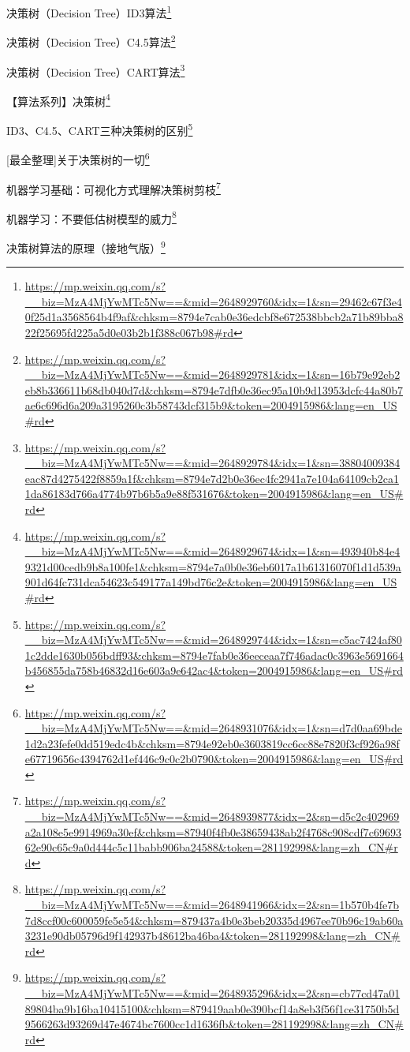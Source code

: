 \documentclass[]{ctexbook}
\renewcommand{\href}[2]{#2\footnote{\url{#1}}}
\begin{document}
\href{https://mp.weixin.qq.com/s?__biz=MzA4MjYwMTc5Nw==\&mid=2648929760\&idx=1\&sn=29462c67f3e40f25d1a3568564b4f9af\&chksm=8794e7cab0e36edcbf8e672538bbcb2a71b89bba822f25695fd225a5d0e03b2b1f388c067b98\#rd}{决策树（Decision Tree）ID3算法}

\href{https://mp.weixin.qq.com/s?__biz=MzA4MjYwMTc5Nw==\&mid=2648929781\&idx=1\&sn=16b79e92eb2eb8b336611b68db040d7d\&chksm=8794e7dfb0e36ec95a10b9d13953dcfc44a80b7ae6c696d6a209a3195260c3b58743dcf315b9\&token=2004915986\&lang=en_US\#rd}{决策树（Decision Tree）C4.5算法}

\href{https://mp.weixin.qq.com/s?__biz=MzA4MjYwMTc5Nw==\&mid=2648929784\&idx=1\&sn=38804009384eac87d4275422f8859a1f\&chksm=8794e7d2b0e36ec4fc2941a7e104a64109cb2ca11da86183d766a4774b97b6b5a9e88f531676\&token=2004915986\&lang=en_US\#rd}{决策树（Decision Tree）CART算法}

\href{https://mp.weixin.qq.com/s?__biz=MzA4MjYwMTc5Nw==\&mid=2648929674\&idx=1\&sn=493940b84e49321d00cedb9b8a100fe1\&chksm=8794e7a0b0e36eb6017a1b61316070f1d1d539a901d64fc731dca54623c549177a149bd76c2e\&token=2004915986\&lang=en_US\#rd}{【算法系列】决策树}

\href{https://mp.weixin.qq.com/s?__biz=MzA4MjYwMTc5Nw==\&mid=2648929744\&idx=1\&sn=c5ac7424af801c2dde1630b056bdff93\&chksm=8794e7fab0e36eeceaa7f746adac0c3963e5691664b456855da758b46832d16e603a9e642ac4\&token=2004915986\&lang=en_US\#rd}{ID3、C4.5、CART三种决策树的区别}

\href{https://mp.weixin.qq.com/s?__biz=MzA4MjYwMTc5Nw==\&mid=2648931076\&idx=1\&sn=d7d0aa69bde1d2a23fefe0dd519edc4b\&chksm=8794e92eb0e3603819cc6cc88e7820f3cf926a98fe67719656c4394762d1ef446c9c0c2b0790\&token=2004915986\&lang=en_US\#rd}{{[}最全整理{]}关于决策树的一切}

\href{https://mp.weixin.qq.com/s?__biz=MzA4MjYwMTc5Nw==\&mid=2648939877\&idx=2\&sn=d5c2c402969a2a108e5e9914969a30ef\&chksm=87940f4fb0e38659438ab2f4768c908cdf7c6969362e90c65c9a0d444c5c11babb906ba24588\&token=281192998\&lang=zh_CN\#rd}{机器学习基础：可视化方式理解决策树剪枝}

\href{https://mp.weixin.qq.com/s?__biz=MzA4MjYwMTc5Nw==\&mid=2648941966\&idx=2\&sn=1b570b4fe7b7d8ccf00c600059fe5e54\&chksm=879437a4b0e3beb20335d4967ee70b96c19ab60a3231e90db05796d9f142937b48612ba46ba4\&token=281192998\&lang=zh_CN\#rd}{机器学习：不要低估树模型的威力}

\href{https://mp.weixin.qq.com/s?__biz=MzA4MjYwMTc5Nw==\&mid=2648935296\&idx=2\&sn=cb77cd47a0189804ba9b16ba10415100\&chksm=879419aab0e390bcf14a8eb3f56f1ce31750b5d9566263d93269d47e4674bc7600cc1d1636fb\&token=281192998\&lang=zh_CN\#rd}{决策树算法的原理（接地气版）}
\end{document}
